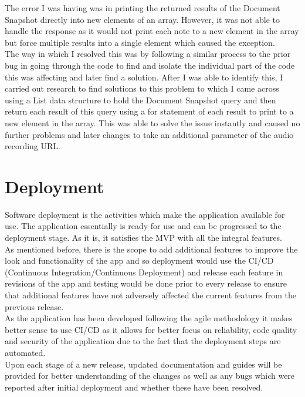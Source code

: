 \documentclass[oneside]{report}
\begin{document}
\begin{enumerate}
The error I was having was in printing the returned results of the Document Snapshot directly into new elements of an array. However, it was not able to handle the response as it would not print each note to a new element in the array but force multiple results into a single element which caused the exception.\\

The way in which I resolved this was by following a similar process to the prior bug in going through the code to find and isolate the individual part of the code this was affecting and later find a solution. After I was able to identify this, I carried out research to find solutions to this problem to which I came across using a List data structure to hold the Document Snapshot query and then return each result of this query using a for statement of each result to print to a new element in the array. This was able to solve the issue instantly and caused no further problems and later changes to take an additional parameter of the audio recording URL.
		 \end{enumerate}
		 
	\section{Deployment}
	Software deployment is the activities which make the application available for use. The application essentially is ready for use and can be progressed to the deployment stage. As it is, it satisfies the MVP with all the integral features. \\

As mentioned before, there is the scope to add additional features to improve the look and functionality of the app and so deployment would use the CI/CD (Continuous Integration/Continuous Deployment) and release each feature in revisions of the app and testing would be done prior to every release to ensure that additional features have not adversely affected the current features from the previous release. \\

As the application has been developed following the agile methodology it makes better sense to use CI/CD as it allows for better focus on reliability, code quality and security of the application due to the fact that the deployment steps are automated. \\

Upon each stage of a new release, updated documentation and guides will be provided for better understanding of the changes as well as any bugs which were reported after initial deployment and whether these have been resolved.\\
\end{document}
